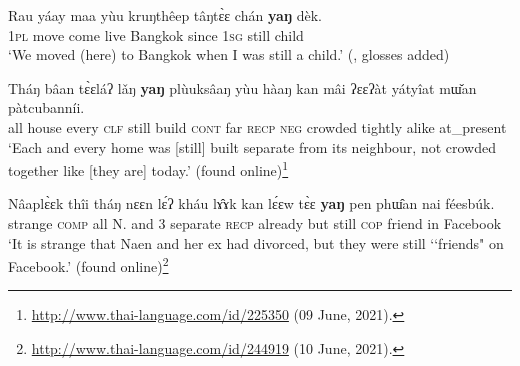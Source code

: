 \begin{exe}
	\ex\label{exAppendixThai1}
	\gll Rau yáay maa yùu kruŋthêep tâŋtɛ̀ɛ chán \textbf{yaŋ} dèk.\\
	1\textsc{pl} move come live Bangkok since 1\textsc{sg} still child\\
	\glt \lq We moved (here) to Bangkok when I was still a child.\rq{ }(\cite[62]{Smyth2002}, glosses added)

	\ex\label{exAppendixThai2}
	\gll Tháŋ		bâan		tɛ̀ɛláʔ		lǎŋ	\textbf{yaŋ}	plùuksâaŋ	yùu hàaŋ		kan		mâi		ʔɛɛʔàt	yátyîat	mɯ̌an	pàtcubanníi.\\
	all house every \textsc{clf} still build \textsc{cont} far \textsc{recp} \textsc{neg} crowded tightly alike at\_present\\
	\glt \lq Each and every home was [still] built separate from its neighbour, not crowded together like [they are] today.' (found online)\footnote{\url{http://www.thai-language.com/id/225350} (09 June, 2021).}

	\ex\label{exAppendixThai3}
	\gll Nâaplɛ̀ɛk	thîi		tháŋ		nɛɛn		lɛ́ʔ	kháu		lɤ̂ɤk		kan	lɛ́ɛw tɛ̀ɛ		\textbf{yaŋ}		pen		phɯ̂an	nai	féesbúk.\\
	strange	\textsc{comp}	all		N.		and	3	separate	\textsc{recp}	already but		still		\textsc{cop}		friend	in	Facebook\\
	\glt \lq It is strange that Naen and her ex had divorced, but they were still \lq\lq friends" on Facebook.' (found online)\footnote{\url{http://www.thai-language.com/id/244919} (10 June, 2021).}
\end{exe}

